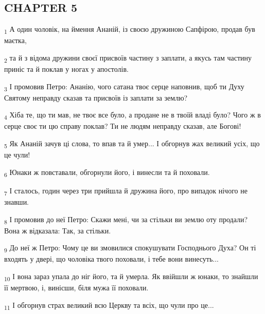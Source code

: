 \subsection{CHAPTER 5}
\begin{tcolorbox}
\textsubscript{1} А один чоловік, на ймення Ананій, із своєю дружиною Сапфірою, продав був маєтка,
\end{tcolorbox}
\begin{tcolorbox}
\textsubscript{2} та й з відома дружини своєї присвоїв частину з заплати, а якусь там частину приніс та й поклав у ногах у апостолів.
\end{tcolorbox}
\begin{tcolorbox}
\textsubscript{3} І промовив Петро: Ананію, чого сатана твоє серце наповнив, щоб ти Духу Святому неправду сказав та присвоїв із заплати за землю?
\end{tcolorbox}
\begin{tcolorbox}
\textsubscript{4} Хіба те, що ти мав, не твоє все було, а продане не в твоїй владі було? Чого ж в серце своє ти цю справу поклав? Ти не людям неправду сказав, але Богові!
\end{tcolorbox}
\begin{tcolorbox}
\textsubscript{5} Як Ананій зачув ці слова, то впав та й умер... І обгорнув жах великий усіх, що це чули!
\end{tcolorbox}
\begin{tcolorbox}
\textsubscript{6} Юнаки ж повставали, обгорнули його, і винесли та й поховали.
\end{tcolorbox}
\begin{tcolorbox}
\textsubscript{7} І сталось, годин через три прийшла й дружина його, про випадок нічого не знавши.
\end{tcolorbox}
\begin{tcolorbox}
\textsubscript{8} І промовив до неї Петро: Скажи мені, чи за стільки ви землю оту продали? Вона ж відказала: Так, за стільки.
\end{tcolorbox}
\begin{tcolorbox}
\textsubscript{9} До неї ж Петро: Чому це ви змовилися спокушувати Господнього Духа? Он ті входять у двері, що чоловіка твого поховали, і тебе вони винесуть...
\end{tcolorbox}
\begin{tcolorbox}
\textsubscript{10} І вона зараз упала до ніг його, та й умерла. Як ввійшли ж юнаки, то знайшли її мертвою, і, винісши, біля мужа її поховали.
\end{tcolorbox}
\begin{tcolorbox}
\textsubscript{11} І обгорнув страх великий всю Церкву та всіх, що чули про це...
\end{tcolorbox}
